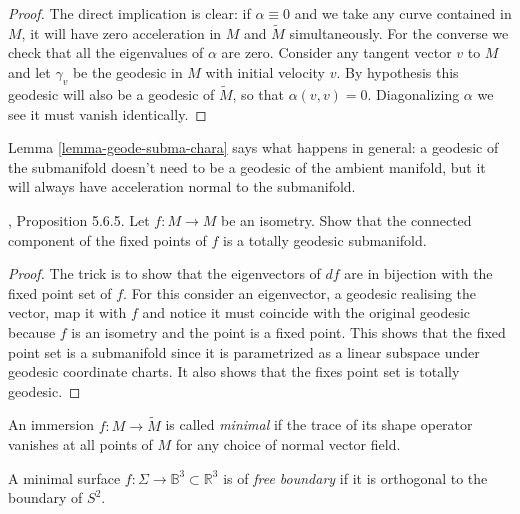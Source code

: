 \documentclass{book}
\begin{document}
\begin{proof}
The direct implication is clear: if $\alpha
\equiv 0$ and we take any curve
contained in $M$, it will have zero
acceleration in $M$ and $\tilde{M}$
simultaneously. For the converse we check
that all the eigenvalues
of $\alpha$ are zero. Consider any tangent
vector $v$ to $M$ and let $\gamma_v$
be the geodesic in $M$ with initial velocity
$v$. By hypothesis this geodesic
will also be a geodesic of $\tilde{M}$, so
that $\alpha(v,v)=0$. Diagonalizing
$\alpha$ we see it must vanish identically.
\end{proof}

Lemma \ref{lemma-geode-subma-chara}
says what happens in
general: a geodesic of the submanifold
doesn't need to be a geodesic of the
ambient manifold, but it will always have
acceleration normal to the
submanifold.

\begin{exercise}
\label{exercise-fixed-point-set-isome-tota}
\cite{pet}, Proposition 5.6.5. Let $f:M\to M$
be an isometry. Show that the
connected component of the fixed points of
$f$ is a totally geodesic
submanifold.
\end{exercise}

\begin{proof}
The trick is to show that the eigenvectors of
$df$ are in bijection with the
fixed point set of $f$. For this consider an
eigenvector, a geodesic realising
the vector, map it with $f$ and notice it
must coincide with the original
geodesic because $f$ is an isometry and the
point is a fixed point. This shows
that the fixed point set is a submanifold
since it is parametrized as a linear
subspace under geodesic coordinate charts. It
also shows that the fixes point
set is totally geodesic.
\end{proof}

\begin{definition}
\label{definition-minimal-immersion}
An immersion $f:M\to\tilde{M}$ is called {\it
minimal} if the trace of its shape
operator vanishes at all points of $M$ for
any choice of normal vector field.
\end{definition}

\begin{definition}
\label{definition-minim-free-bound-immer}
A minimal surface $f:\Sigma\to
\mathbb{B}^3\subset \mathbb{R}^3$
is of {\it free boundary} if it is orthogonal
to the boundary of $S^2$.
\end{definition}
\end{document}
